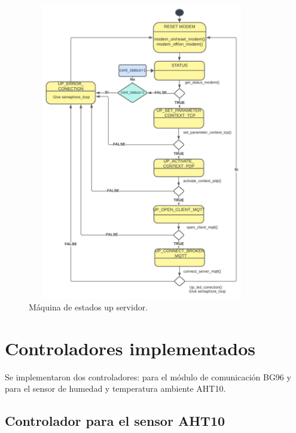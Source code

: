 \begin{figure}[t!]
  \centering
	\includegraphics[width=10cm, height=13cm]{./Figures/SM up server.png}
	\caption{Máquina de estados up servidor.}
	\label{fig:Maquina de estados up servidor}
\end{figure}

\section{Controladores implementados}
Se implementaron dos controladores: para el módulo de comunicación BG96 y para el sensor de humedad y temperatura ambiente AHT10.

\subsection{Controlador para el sensor AHT10} 

